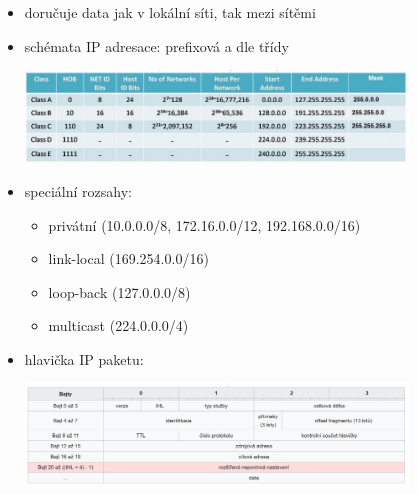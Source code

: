 \begin{itemize}
	\item doručuje data jak v lokální síti, tak mezi sítěmi
	\item schémata IP adresace: prefixová a dle třídy

	\includegraphics[width=0.8\textwidth]{img/SP-24_3.jpg}	
	
	\item speciální rozsahy:
	\begin{itemize}
		\item privátní (10.0.0.0/8, 172.16.0.0/12, 192.168.0.0/16)
		\item link-local (169.254.0.0/16)
		\item loop-back (127.0.0.0/8)
		\item multicast (224.0.0.0/4)
	\end{itemize}
	
	\item hlavička IP paketu:
	
	\includegraphics[width=0.8\textwidth]{img/SP-24_4.jpg}
	

\end{itemize}
